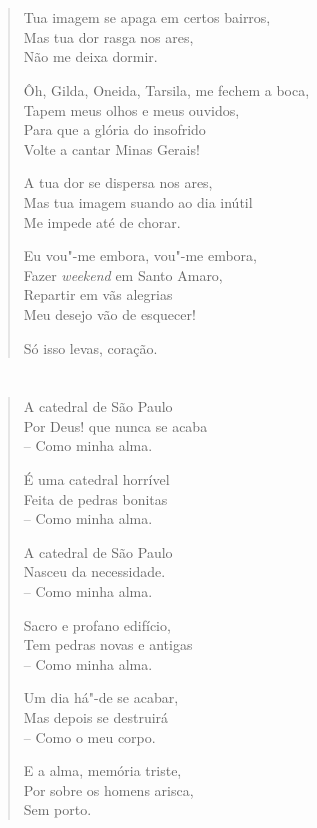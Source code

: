 \chapter*{}

\begin{verse}
Tua imagem se apaga em certos bairros,\\
Mas tua dor rasga nos ares,\\
Não me deixa dormir.

Ôh, Gilda, Oneida, Tarsila, me fechem a boca,\\
Tapem meus olhos e meus ouvidos,\\
Para que a glória do insofrido\\
Volte a cantar Minas Gerais!

A tua dor se dispersa nos ares,\\
Mas tua imagem suando ao dia inútil\\
Me impede até de chorar.

Eu vou"-me embora, vou"-me embora,\\
Fazer \emph{weekend} em Santo Amaro,\\
Repartir em vãs alegrias\\
Meu desejo vão de esquecer!

Só isso levas, coração.
\end{verse}

\chapter*{}

\begin{verse}
A catedral de São Paulo\\
Por Deus! que nunca se acaba\\
-- Como minha alma.

É uma catedral horrível\\
Feita de pedras bonitas\\
-- Como minha alma.

A catedral de São Paulo\\
Nasceu da necessidade.\\
-- Como minha alma.

Sacro e profano edifício,\\
Tem pedras novas e antigas\\
-- Como minha alma.

Um dia há"-de se acabar,\\
Mas depois se destruirá\\
-- Como o meu corpo.

E a alma, memória triste,\\
Por sobre os homens arisca,\\
Sem porto.
\end{verse}


